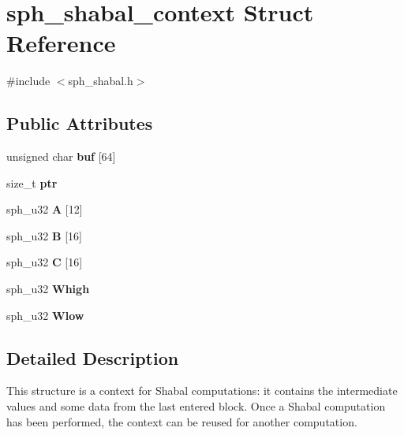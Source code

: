 \hypertarget{structsph__shabal__context}{}\section{sph\+\_\+shabal\+\_\+context Struct Reference}
\label{structsph__shabal__context}


{\ttfamily \#include $<$sph\+\_\+shabal.\+h$>$}

\subsection*{Public Attributes}
\begin{DoxyCompactItemize}
\item 
\mbox{\label{structsph__shabal__context_aa8cc43a8ee6647315c9f071cdba55c9c}} 
unsigned char {\bfseries buf} \mbox{[}64\mbox{]}
\item 
\mbox{\label{structsph__shabal__context_a1e120c97c8f2f4eb603078a38a07b7a7}} 
size\+\_\+t {\bfseries ptr}
\item 
\mbox{\label{structsph__shabal__context_a20a5034136e5de14f8bf1230b05f8778}} 
sph\+\_\+u32 {\bfseries A} \mbox{[}12\mbox{]}
\item 
\mbox{\label{structsph__shabal__context_a12a0f0c5ec3fb02ee5e4c66cc822abdf}} 
sph\+\_\+u32 {\bfseries B} \mbox{[}16\mbox{]}
\item 
\mbox{\label{structsph__shabal__context_a17503cfe31b9fa2ca049e16f06ea48e1}} 
sph\+\_\+u32 {\bfseries C} \mbox{[}16\mbox{]}
\item 
\mbox{\label{structsph__shabal__context_af53db02660fbbe08edd309e7fb6f48ff}} 
sph\+\_\+u32 {\bfseries Whigh}
\item 
\mbox{\label{structsph__shabal__context_a2cff9fa7f34f58169689c7f8d6e7bdb9}} 
sph\+\_\+u32 {\bfseries Wlow}
\end{DoxyCompactItemize}


\subsection{Detailed Description}
This structure is a context for Shabal computations\+: it contains the intermediate values and some data from the last entered block. Once a Shabal computation has been performed, the context can be reused for another computation.

